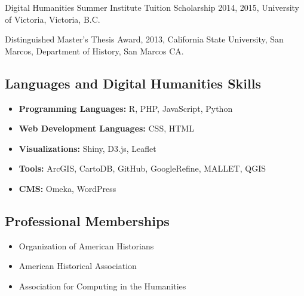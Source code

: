 \documentclass[11pt]{article}
\begin{document}
Digital Humanities Summer Institute Tuition Scholarship 2014, 2015, University of Victoria, Victoria, B.C.

Distinguished Master's Thesis Award, 2013, California State University, San Marcos, Department of History, San Marcos CA.


\subsection{Languages and Digital Humanities Skills}
\begin{itemize}
  \itemsep0em 
  \item\textbf{Programming Languages:} R, PHP, JavaScript, Python
  \item\textbf{Web Development Languages:} CSS, HTML
  \item\textbf{Visualizations:} Shiny, D3.js, Leaflet
  \item\textbf{Tools:} ArcGIS, CartoDB, GitHub, GoogleRefine, MALLET, QGIS
  \item\textbf{CMS:} Omeka, WordPress
\end{itemize}

\subsection{Professional Memberships}
\begin{itemize}
  \itemsep0em 
  \item{Organization of American Historians}
  \item{American Historical Association}
  \item{Association for Computing in the Humanities}
\end{itemize}
\end{document}
